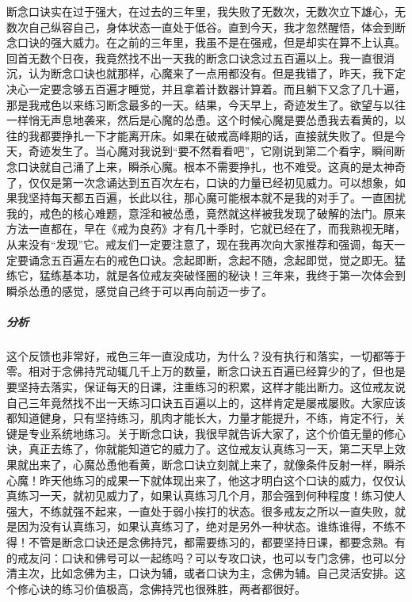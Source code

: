 \begin{case}
    断念口诀实在过于强大，在过去的三年里，我失败了无数次，无数次立下雄心，无数次自己纵容自己，身体状态一直处于低谷。直到今天，我才忽然醒悟，体会到断念口诀的强大威力。在之前的三年里，我虽不是在强戒，但是却实在算不上认真。回首无数个日夜，我竟然找不出一天我的断念口诀念过五百遍以上。我一直很消沉，认为断念口诀也就那样，心魔来了一点用都没有。但是我错了，昨天，我下定决心一定要念够五百遍才睡觉，并且拿着计数器计算着。而且躺下又念了几十遍，那是我戒色以来练习断念最多的一天。结果，今天早上，奇迹发生了。欲望与以往一样悄无声息地袭来，然后是心魔的怂恿。这个时候心魔是要怂恿我去看黄的，以往的我都要挣扎一下才能离开床。如果在破戒高峰期的话，直接就失败了。但是今天，奇迹发生了。当心魔对我说到“要不然看看吧”，它刚说到第二个看字，瞬间断念口诀就自己涌了上来，瞬杀心魔。根本不需要挣扎，也不难受。这真的是太神奇了，仅仅是第一次念诵达到五百次左右，口诀的力量已经初见威力。可以想象，如果我坚持每天都五百遍，长此以往，那心魔可能根本就不是我的对手了。一直困扰我的，戒色的核心难题，意淫和被怂恿，竟然就这样被我发现了破解的法门。原来方法一直都在，早在《戒为良药》才有几十季时，它就已经在了，而我熟视无睹，从来没有“发现”它。戒友们一定要注意了，现在我再次向大家推荐和强调，每天一定要诵念五百遍左右的戒色口诀。念起即断，念起不随，念起即觉，觉之即无。猛练它，猛练基本功，就是各位戒友突破怪圈的秘诀！三年来，我终于第一次体会到瞬杀怂恿的感觉，感觉自己终于可以再向前迈一步了。
    \subparagraph{分析} 这个反馈也非常好，戒色三年一直没成功，为什么？没有执行和落实，一切都等于零。相对于念佛持咒动辄几千上万的数量，断念口诀五百遍已经算少的了，但也是要坚持去落实，保证每天的日课，注重练习的积累，这样才能出断力。这位戒友说自己三年竟然找不出一天练习口诀五百遍以上的，这样肯定是屡戒屡败。大家应该都知道健身，只有坚持练习，肌肉才能长大，力量才能提升，不练，肯定不行，关键是专业系统地练习。关于断念口诀，我很早就告诉大家了，这个价值无量的修心诀，真正去练了，你就能知道它的威力了。这位戒友认真练习一天，第二天早上效果就出来了，心魔怂恿他看黄，断念口诀立刻就上来了，就像条件反射一样，瞬杀心魔！昨天他练习的成果一下就体现出来了，他这才明白这个口诀的威力，仅仅认真练习一天，就初见威力了，如果认真练习几个月，那会强到何种程度！练习使人强大，不练就强不起来，一直处于弱小挨打的状态。很多戒友之所以一直失败，就是因为没有认真练习，如果认真练习了，绝对是另外一种状态。谁练谁得，不练不得！不管是断念口诀还是念佛持咒，都需要练习的，都要坚持日课，都要念熟。有的戒友问：口诀和佛号可以一起练吗？可以专攻口诀，也可以专门念佛，也可以分清主次，比如念佛为主，口诀为辅，或者口诀为主，念佛为辅。自己灵活安排。这个修心诀的练习价值极高，念佛持咒也很殊胜，两者都很好。
\end{case}

